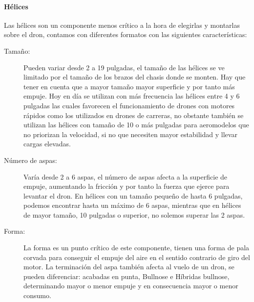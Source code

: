  
\paragraph{Hélices}
\label{SSS:Helices}

 Las hélices son un componente menos crítico a la hora de elegirlas y montarlas sobre el dron, contamos con diferentes formatos con las siguientes características:
 \begin{description}
        \item[Tamaño:] Pueden variar desde 2 a 19 pulgadas, el tamaño de las hélices se ve limitado por el tamaño de los brazos del chasis donde se monten. Hay que tener en cuenta que a mayor tamaño mayor superficie y por tanto más empuje. Hoy en día se utilizan con más frecuencia las hélices entre 4 y 6 pulgadas las cuales favorecen el funcionamiento de drones con motores rápidos como los utilizados en drones de carreras, no obstante también se utilizan las hélices con tamaño de 10 o más pulgadas para aeromodelos que no priorizan la velocidad, si no que necesiten mayor estabilidad y llevar cargas elevadas.
 		\item[Número de aspas:] Varía desde 2 a 6 aspas, el número de aspas afecta a la superficie de empuje, aumentando la fricción y por tanto la fuerza que ejerce para levantar el dron. En hélices con un  tamaño pequeño de hasta 6 pulgadas, podemos encontrar hasta un máximo de 6 aspas, mientras que en hélices de mayor tamaño, 10 pulgadas o superior, no solemos superar las 2 aspas.
 		\item[Forma:] La forma es un punto crítico de este componente, tienen una forma de pala corvada para conseguir el empuje del aire en el sentido contrario de giro del motor. La terminación del aspa también afecta al vuelo de un dron, se pueden diferenciar: acabadas en punta,  Bullnose e Híbridas bullnose, determinando mayor o menor empuje y en consecuencia mayor o menor consumo.

 
 \end{description}
 

